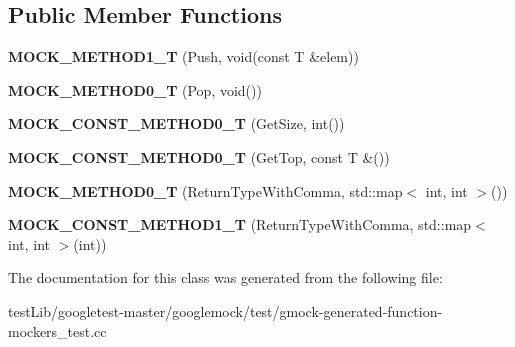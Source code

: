\subsection*{Public Member Functions}
\begin{DoxyCompactItemize}
\item 
\mbox{\label{classtesting_1_1gmock__generated__function__mockers__test_1_1MockStack_a0ad833bc6134c5150b8271a5ba2e91b5}} 
{\bfseries M\+O\+C\+K\+\_\+\+M\+E\+T\+H\+O\+D1\+\_\+T} (Push, void(const T \&elem))
\item 
\mbox{\label{classtesting_1_1gmock__generated__function__mockers__test_1_1MockStack_a5e55ffb22e7f11c6940a97bd001bd50c}} 
{\bfseries M\+O\+C\+K\+\_\+\+M\+E\+T\+H\+O\+D0\+\_\+T} (Pop, void())
\item 
\mbox{\label{classtesting_1_1gmock__generated__function__mockers__test_1_1MockStack_a6171be20e8e4f44464cc8968e05b7c7a}} 
{\bfseries M\+O\+C\+K\+\_\+\+C\+O\+N\+S\+T\+\_\+\+M\+E\+T\+H\+O\+D0\+\_\+T} (Get\+Size, int())
\item 
\mbox{\label{classtesting_1_1gmock__generated__function__mockers__test_1_1MockStack_ae5950cfac08382a0ffc7c3bd5aba405f}} 
{\bfseries M\+O\+C\+K\+\_\+\+C\+O\+N\+S\+T\+\_\+\+M\+E\+T\+H\+O\+D0\+\_\+T} (Get\+Top, const T \&())
\item 
\mbox{\label{classtesting_1_1gmock__generated__function__mockers__test_1_1MockStack_a4b67d1f5b795e7c072fb846217a8f130}} 
{\bfseries M\+O\+C\+K\+\_\+\+M\+E\+T\+H\+O\+D0\+\_\+T} (Return\+Type\+With\+Comma, std\+::map$<$ int, int $>$())
\item 
\mbox{\label{classtesting_1_1gmock__generated__function__mockers__test_1_1MockStack_a69b9a7d0231b729d8a47201a49fa9166}} 
{\bfseries M\+O\+C\+K\+\_\+\+C\+O\+N\+S\+T\+\_\+\+M\+E\+T\+H\+O\+D1\+\_\+T} (Return\+Type\+With\+Comma, std\+::map$<$ int, int $>$(int))
\end{DoxyCompactItemize}


The documentation for this class was generated from the following file\+:\begin{DoxyCompactItemize}
\item 
test\+Lib/googletest-\/master/googlemock/test/gmock-\/generated-\/function-\/mockers\+\_\+test.\+cc\end{DoxyCompactItemize}
